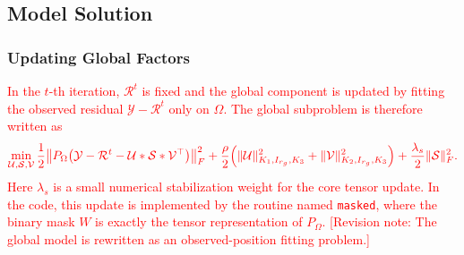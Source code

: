 \documentclass[a4paper,12pt]{article}
\numberwithin{equation}{section}
\numberwithin{algorithm}{section}
\newcommand{\rev}[1]{\textcolor{red}{#1}}
\newcommand{\revnote}[1]{\textcolor{red}{[Revision note: #1]}}
\theoremstyle{remark}
\theoremstyle{definition}
\begin{document}
\subsection{Model Solution}
\label{sec:solution}

\subsubsection{Updating Global Factors}
\rev{In the $t$-th iteration, $\mathcal{R}^{t}$ is fixed and the global component is updated by fitting the observed residual $\mathcal{Y}-\mathcal{R}^{t}$ only on $\Omega$. The global subproblem is therefore written as}
\begin{equation}
	\rev{\min_{\mathcal{U},\mathcal{S},\mathcal{V}}
	\frac12\big\|P_{\Omega}\big(\mathcal{Y}-\mathcal{R}^{t}-\mathcal{U}*\mathcal{S}*\mathcal{V}^{\top}\big)\big\|_F^2
	+\frac{\rho}{2}\Big(\|\mathcal{U}\|^{2}_{K_1,I_{r_g},K_3}+\|\mathcal{V}\|^{2}_{K_2,I_{r_g},K_3}\Big)
	+\frac{\lambda_s}{2}\|\mathcal{S}\|_F^2.}
	\label{eq:global_subprob_observed}
\end{equation}
\rev{Here $\lambda_s$ is a small numerical stabilization weight for the core tensor update. In the code, this update is implemented by the routine named \texttt{masked}, where the binary mask $W$ is exactly the tensor representation of $P_{\Omega}$.} \revnote{The global model is rewritten as an observed-position fitting problem.}
\end{document}
